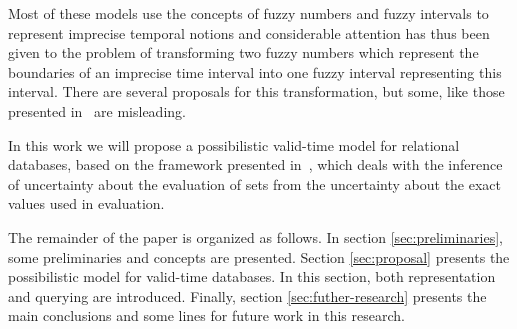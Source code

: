 Most of these models use the concepts of fuzzy numbers and fuzzy intervals to represent imprecise temporal notions and considerable attention has thus been given to the problem of transforming two fuzzy numbers which represent the boundaries of an imprecise time interval into one fuzzy interval representing this interval. There are several proposals for this transformation, but some, like those presented in~\cite{Garrido2009} are misleading. 

In this work we will propose a possibilistic valid-time model for relational databases, based on the framework presented in~\cite{Pons2011}, which deals with the inference of uncertainty about the evaluation of sets from the uncertainty about the exact values used in evaluation. 

The remainder of the paper is organized as follows. In section \ref{sec:preliminaries}, some preliminaries and concepts are presented. 
Section \ref{sec:proposal} presents the possibilistic model for valid-time databases. In this section, both representation and querying are introduced.
Finally, section \ref{sec:futher-research} presents the main conclusions and some lines for future work in this research.
